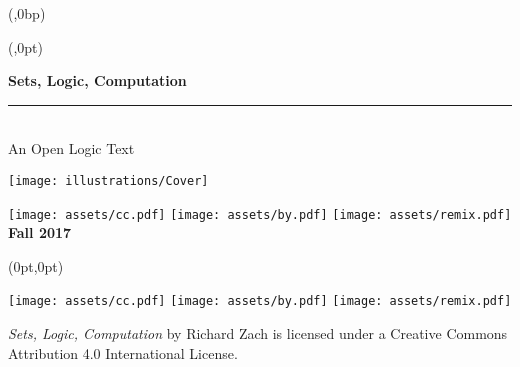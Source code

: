 \documentclass{memoir}
\newlength{\coverheight}
\newlength{\spinewidth}
\newlength{\spinepos} %
\newlength{\coverpos} %
\begin{document}
\pagestyle{empty}


\pagecolor{leadbeater}

\begin{textblock*}{\spinewidth}(\spinepos,0bp)%
\noindent\hfil{}\hfil
\end{textblock*}
\newbox\adjust
\begin{textblock*}{\spinepos}(\coverpos,0pt)
  \noindent\hfil
  \begin{minipage}[b][\coverheight][s]{.8\spinepos}
   \vspace{1.5cm}
    \begin{raggedright}
      \fontsize{32pt}{34pt}\selectfont\bfseries\sffamily%
      Sets, Logic, Computation\\
      \normalfont\fontsize{18pt}{0pt}\selectfont\bfseries\itshape%
      \rule{.8\spinepos}{5pt}\\[5pt]
      An Open Logic Text
    \end{raggedright}
    \noindent\vskip2cm\texttt{[image: illustrations/Cover]}

    \par\noindent
    \vskip 1.5cm
    \noindent
\texttt{[image: assets/cc.pdf]}
\texttt{[image: assets/by.pdf]}
\texttt{[image: assets/remix.pdf]}
\normalfont\fontsize{16pt}{0pt}\selectfont\bfseries\sffamily%
\hfill Fall 2017%
\end{minipage}
\hfil
  \end{textblock*}

\begin{textblock*}{\spinepos}(0pt,0pt)
  \noindent\hspace{1.5cm}
  \begin{minipage}[b][\coverheight][b]{.85\spinepos}
\begin{minipage}[b]{1cm}
\texttt{[image: assets/cc.pdf]}
\texttt{[image: assets/by.pdf]}
\texttt{[image: assets/remix.pdf]}
\end{minipage}
\hspace{.3cm}
\begin{minipage}[b]{4.7cm}
  \fontsize{11pt}{1.4em}\selectfont\textit{Sets, Logic, Computation}
by Richard Zach is licensed under a Creative Commons Attribution 4.0
International License.
\end{minipage}
\hfill
\vspace*{2cm}
  \end{minipage}
  \hfill
\end{textblock*}
\end{document}
